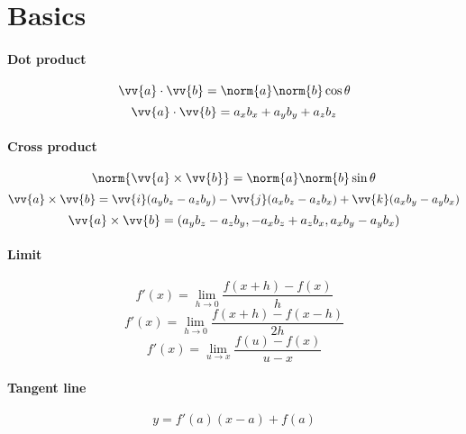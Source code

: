 \section{Basics}
\paragraph{Dot product}
	\begin{equation}
		\vv{a} \cdot \vv{b} = \norm{a} \norm{b} \cos \theta
	\end{equation}
	\begin{equation}
		\vv{a} \cdot \vv{b} = a_xb_x + a_yb_y + a_zb_z
	\end{equation}
\paragraph{Cross product}
	\begin{equation}
		\norm{\vv{a} \times \vv{b}} = \norm{a} \norm{b} \sin \theta
	\end{equation}
	\begin{equation}
		\vv{a} \times \vv{b} = \vv{i}(a_yb_z - a_zb_y) - \vv{j}(a_xb_z - a_zb_x) + \vv{k}(a_xb_y - a_yb_x)
	\end{equation}
	\begin{equation}
		\vv{a} \times \vv{b} = (a_yb_z - a_zb_y, -a_xb_z + a_zb_x, a_xb_y - a_yb_x)
	\end{equation}
\paragraph{Limit}
	\begin{equation}
		f'(x) = \lim_{h \to 0}\frac{f(x+h) - f(x)}{h}
	\end{equation}
	\begin{equation}
		f'(x) = \lim_{h \to 0}\frac{f(x+h) - f(x - h)}{2h}
	\end{equation}
	\begin{equation}
		f'(x) = \lim_{u \to x}\frac{f(u) - f(x)}{u-x}
	\end{equation}
\paragraph{Tangent line}
	\begin{equation}
		y = f'(a)(x-a) + f(a)
	\end{equation}
